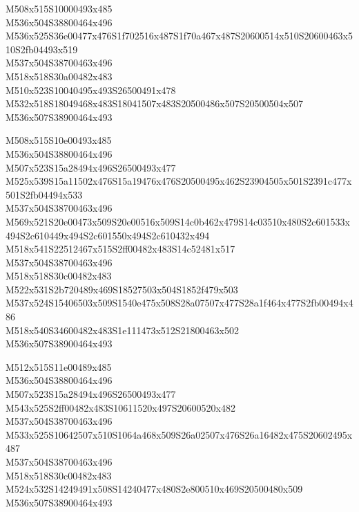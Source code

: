 \documentclass{article}
\begin{document}
\begin{multicols}{5}
\begin{center}

M508x515S10000493x485 %
\\M536x504S38800464x496 %
\\M536x525S36e00477x476S1f702516x487S1f70a467x487S20600514x510S20600463x510S2fb04493x519 %
\\M537x504S38700463x496 %
\\M518x518S30a00482x483 %
\\M510x523S10040495x493S26500491x478 %
\\M532x518S18049468x483S18041507x483S20500486x507S20500504x507 %
\\M536x507S38900464x493 %
\vfil
\columnbreak

M508x515S10e00493x485 %
\\M536x504S38800464x496 %
\\M507x523S15a28494x496S26500493x477 %
\\M525x539S15a11502x476S15a19476x476S20500495x462S23904505x501S2391c477x501S2fb04494x533 %
\\M537x504S38700463x496 %
\\M569x521S20e00473x509S20e00516x509S14c0b462x479S14c03510x480S2c601533x494S2c610449x494S2c601550x494S2c610432x494 %
\\M518x541S22512467x515S2ff00482x483S14c52481x517 %
\\M537x504S38700463x496 %
\\M518x518S30c00482x483 %
\\M522x531S2b720489x469S18527503x504S1852f479x503 %
\\M537x524S15406503x509S1540e475x508S28a07507x477S28a1f464x477S2fb00494x486 %
\\M518x540S34600482x483S1e111473x512S21800463x502 %
\\M536x507S38900464x493 %
\vfil
\columnbreak

M512x515S11e00489x485 %
\\M536x504S38800464x496 %
\\M507x523S15a28494x496S26500493x477 %
\\M543x525S2ff00482x483S10611520x497S20600520x482 %
\\M537x504S38700463x496 %
\\M533x525S10642507x510S1064a468x509S26a02507x476S26a16482x475S20602495x487 %
\\M537x504S38700463x496 %
\\M518x518S30c00482x483 %
\\M524x532S14249491x508S14240477x480S2e800510x469S20500480x509 %
\\M536x507S38900464x493 %
\vfil
\columnbreak


\end{center}
\end{multicols}
\end{document}
